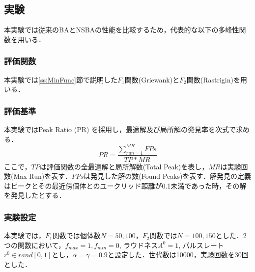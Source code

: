 \documentclass[a4j,11pt]{jarticle}
\begin{document}
\subsection{実験}
\label{ss:NSBA-exp}
本実験では従来のBAとNSBAの性能を比較するため，代表的な以下の多峰性関数を用いる．

\subsubsection{評価関数}
\label{sss:NSBA-func}
本実験では\ref{ss:MinFunc}節で説明した$F_1$関数(Griewank)と$F_2$関数(Rastrigin)を用いる．


\FloatBarrier

\subsubsection{評価基準}
\label{sss:NSBA-eval}
本実験ではPeak Ratio (PR) \cite{CDE} を採用し，最適解及び局所解の発見率を次式で求める．
\begin{equation}
\label{eq:PR}
PR=\frac{\sum_{run=1}^{MR}FPs}{TP*MR}
\end{equation}
ここで，$TP$は評価関数の全最適解と局所解数(Total Peak)を表し，$MR$は実験回数(Max Run)を表す．$FPs$は発見した解の数(Found Peaks)を表す．解発見の定義はピークとその最近傍個体とのユークリッド距離が0.1未満であった時，その解を発見したとする．

\subsubsection{実験設定}
\label{sss:nsba-setup}
本実験では，$F_1$関数では個体数$N=50,100$，$F_2$関数では$N=100,150$とした．2つの関数において，$f_{max}=1, f_{min}=0$, ラウドネス$A^0=1$, パルスレート$r^0 \in rand[0,1]$とし，$\alpha = \gamma = 0.9$と設定した．世代数は10000，実験回数を30回とした．
\end{document}
